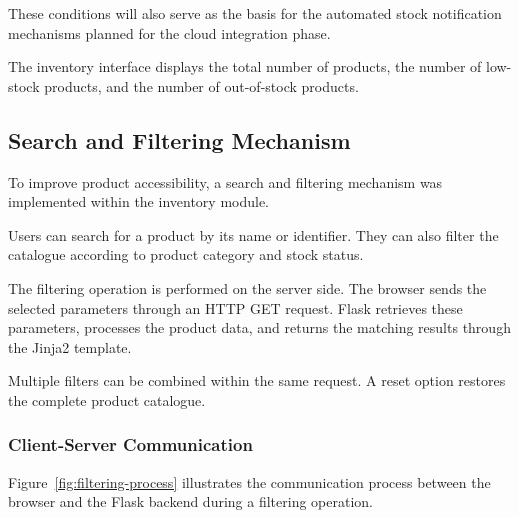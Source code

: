 These conditions will also serve as the basis for the
automated stock notification mechanisms planned for the
cloud integration phase.

The inventory interface displays the total number of
products, the number of low-stock products, and the number
of out-of-stock products.


\subsection{Search and Filtering Mechanism}

To improve product accessibility, a search and filtering
mechanism was implemented within the inventory module.

Users can search for a product by its name or identifier.
They can also filter the catalogue according to product
category and stock status.

The filtering operation is performed on the server side.
The browser sends the selected parameters through an HTTP
GET request. Flask retrieves these parameters, processes
the product data, and returns the matching results through
the Jinja2 template.

Multiple filters can be combined within the same request.
A reset option restores the complete product catalogue.

\subsubsection{Client-Server Communication}

Figure~\ref{fig:filtering-process} illustrates the
communication process between the browser and the Flask
backend during a filtering operation.


